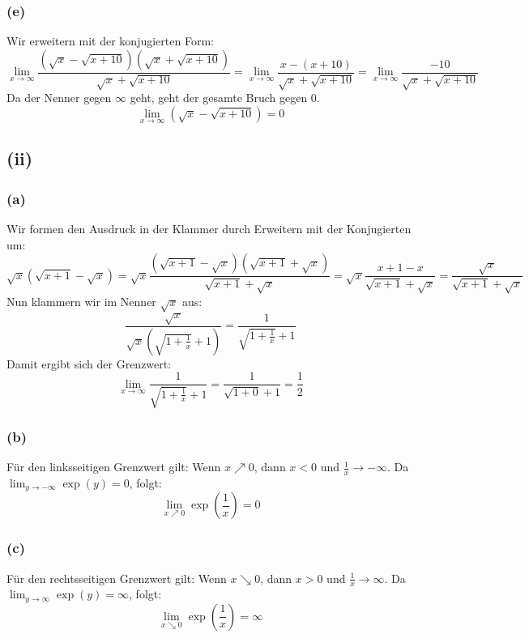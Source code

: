 \documentclass{article}
\begin{document}
\subsubsection*{(e)}
Wir erweitern mit der konjugierten Form:
\[\lim_{x\to\infty} \frac{(\sqrt{x} - \sqrt{x+10})(\sqrt{x} + \sqrt{x+10})}{\sqrt{x} + \sqrt{x+10}} = \lim_{x\to\infty} \frac{x - (x+10)}{\sqrt{x} + \sqrt{x+10}} = \lim_{x\to\infty} \frac{-10}{\sqrt{x} + \sqrt{x+10}}\]
Da der Nenner gegen \(\infty\) geht, geht der gesamte Bruch gegen 0.
\[\lim_{x\to\infty} (\sqrt{x} - \sqrt{x+10}) = 0\]

\subsection*{(ii)}
\subsubsection*{(a)}
Wir formen den Ausdruck in der Klammer durch Erweitern mit der Konjugierten um:
\[\sqrt{x}(\sqrt{x+1} - \sqrt{x}) = \sqrt{x} \frac{(\sqrt{x+1} - \sqrt{x})(\sqrt{x+1} + \sqrt{x})}{\sqrt{x+1} + \sqrt{x}} = \sqrt{x} \frac{x+1-x}{\sqrt{x+1} + \sqrt{x}} = \frac{\sqrt{x}}{\sqrt{x+1} + \sqrt{x}}\]
Nun klammern wir im Nenner \(\sqrt{x}\) aus:
\[\frac{\sqrt{x}}{\sqrt{x}(\sqrt{1+\frac{1}{x}} + 1)} = \frac{1}{\sqrt{1+\frac{1}{x}} + 1}\]
Damit ergibt sich der Grenzwert:
\[\lim_{x\to\infty} \frac{1}{\sqrt{1+\frac{1}{x}} + 1} = \frac{1}{\sqrt{1+0} + 1} = \frac{1}{2}\]

\subsubsection*{(b)}
Für den linksseitigen Grenzwert gilt: Wenn \(x \nearrow 0\), dann \(x<0\) und \(\frac{1}{x} \to -\infty\).
Da \(\lim_{y\to-\infty} \exp(y) = 0\), folgt:
\[\lim_{x\nearrow0} \exp\left(\frac{1}{x}\right) = 0\]

\subsubsection*{(c)}
Für den rechtsseitigen Grenzwert gilt: Wenn \(x \searrow 0\), dann \(x>0\) und \(\frac{1}{x} \to \infty\).
Da \(\lim_{y\to\infty} \exp(y) = \infty\), folgt:
\[\lim_{x\searrow0} \exp\left(\frac{1}{x}\right) = \infty\]
\end{document}
